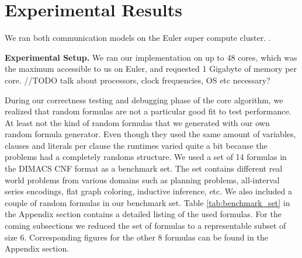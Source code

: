 \documentclass[letterpaper]{article}
\newcommand{\mypar}[1]{{\bf #1.}}
\begin{document}
\section{Experimental Results}\label{sec:exp}

We ran both communication models on the Euler super compute cluster. \cite{euler}.

\mypar{Experimental Setup}
We ran our implementation on up to 48 cores, which was the maximum accessible to us on Euler, and requested 1 Gigabyte of memory per core.
//TODO talk about processors, clock frequencies, OS etc necessary?

During our correctness testing and debugging phase of the core algorithm, we realized that random formulas are not a particular good fit to test performance.
At least not the kind of random formulas that we generated with our own random formula generator.
Even though they used the same amount of variables, clauses and literals per clause the runtimes varied quite a bit because the problems had a completely randoms structure.
We used a set of 14 formulas in the DIMACS CNF format as a benchmark set.
The set contains different real world problems from various domains such as planning problems, all-interval series encodings, flat graph coloring, inductive inference, etc.
We also included a couple of random formulas in our benchmark set.
Table \ref{tab:benchmark_set} in the Appendix section contains a detailed listing of the used formulas.
For the coming subsections we reduced the set of formulas to a representable subset of size 6.
Corresponding figures for the other 8 formulas can be found in the Appendix section.
\end{document}
